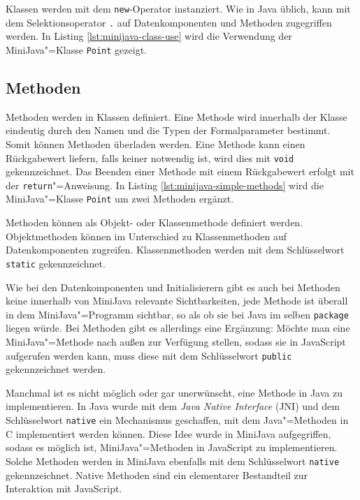 

Klassen werden mit dem \lstinline{new}-Operator instanziert. Wie in Java üblich, kann mit dem Selektionsoperator \lstinline{.} auf Datenkomponenten und Methoden zugegriffen werden. In Listing \ref{lst:minijava-class-use} wird die Verwendung der MiniJava"=Klasse \lstinline{Point} gezeigt.

\pagebreak


\subsection{Methoden}
\label{subsec:MiniJava-Methoden}

Methoden werden in Klassen definiert. Eine Methode wird innerhalb der Klasse eindeutig durch den Namen und die Typen der Formalparameter bestimmt. Somit können Methoden überladen werden. Eine Methode kann einen Rückgabewert liefern, falls keiner notwendig ist, wird dies mit \lstinline{void} gekennzeichnet. Das Beenden einer Methode mit einem Rückgabewert erfolgt mit der \lstinline{return}"=Anweisung. In Listing \ref{lst:minijava-simple-methods} wird die MiniJava"=Klasse \lstinline{Point} um zwei Methoden ergänzt.



Methoden können als Objekt- oder Klassenmethode definiert werden. Objektmethoden können im Unterschied zu Klassenmethoden auf Datenkomponenten zugreifen. Klassenmethoden werden mit dem Schlüsselwort \lstinline{static} gekennzeichnet.

Wie bei den Datenkomponenten und Initialisierern gibt es auch bei Methoden keine innerhalb von MiniJava relevante Sichtbarkeiten, jede Methode ist überall in dem MiniJava"=Programm sichtbar, so als ob sie bei Java im selben \lstinline{package} liegen würde. Bei Methoden gibt es allerdings eine Ergänzung: Möchte man eine MiniJava"=Methode nach außen zur Verfügung stellen, sodass sie in JavaScript aufgerufen werden kann, muss diese mit dem Schlüsselwort \lstinline{public} gekennzeichnet werden.

Manchmal ist es nicht möglich oder gar unerwünscht, eine Methode in Java zu implementieren. In Java wurde mit dem \emph{Java Native Interface} (JNI) \cite{JNI8} und dem Schlüsselwort \lstinline{native} ein Mechanismus geschaffen, mit dem Java"=Methoden in C implementiert werden können. Diese Idee wurde in MiniJava aufgegriffen, sodass es möglich ist, MiniJava"=Methoden in JavaScript zu implementieren. Solche Methoden werden in MiniJava ebenfalls mit dem Schlüsselwort \lstinline{native} gekennzeichnet. Native Methoden sind ein elementarer Bestandteil zur Interaktion mit JavaScript.

